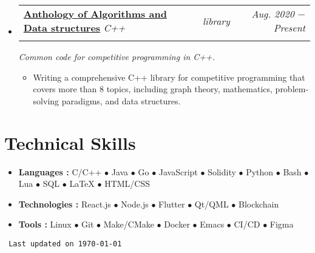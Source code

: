\documentclass[letterpaper, 11pt]{article}
\makeatletter
\newcommand{\project}[7] {
	\vspace{-1pt}\item[]
  \begin{tabular*}{1\textwidth}[t]{ll@{\extracolsep{\fill}}r}
    #1 \href{#4}{\textbf{\color{RoyalBlue}#2}}
    \textbar{} \textit{\small#5} \textbar{ } & \textit{\footnotesize#7} & \textit{\small #3} \\
    \vspace{-8pt}
  \end{tabular*}
  \textit{\small #6}
  \vspace{-8pt}
}
\newcommand{\subproject}[1] {
\item\small
  {#1}
  \vspace{-2pt}
}
\newcommand{\technicalskill}[3] {
  \vspace{-1pt}
\item\small
  #1 \textbf{#2 : }{\footnotesize{#3}}
  \vspace{-2pt}
}
\newcommand{\bulletitem}[1] {{\tiny$\bullet$} #1}
\makeatother
\begin{document}
\begin{itemize}[leftmargin=0pt]

  \project
  {\faIcon{laptop-code}}
  {Anthology of Algorithms and Data structures}{Aug. 2020 $-$ Present}
  {https://github.com/AbdeltwabMF/anthology-of-algorithms-and-data-structures}{C++}
  {Common code for competitive programming in C++.}{library}

  \begin{itemize}
    \subproject
    {Writing a comprehensive C++ library for competitive programming that covers more than 8 topics, including graph theory, mathematics, problem-solving paradigms, and data structures.}
  \end{itemize}\vspace{-4pt}
\end{itemize}

\section{Technical Skills}
\begin{itemize}[leftmargin=*]
  \technicalskill
  {}{Languages}
	{C/C++ \bulletitem{Java} \bulletitem{Go} \bulletitem{JavaScript} \bulletitem{Solidity} \bulletitem{Python} \bulletitem{Bash} \bulletitem{Lua} \bulletitem{SQL} \bulletitem{\LaTeX{}} \bulletitem{HTML/CSS}}

  \technicalskill
  {}{Technologies}
	{React.js \bulletitem{Node.js} \bulletitem{Flutter} \bulletitem{Qt/QML} \bulletitem{Blockchain}}

  \technicalskill
  {}{Tools}
  {Linux \bulletitem{Git} \bulletitem{Make/CMake} \bulletitem{Docker} \bulletitem{Emacs} \bulletitem{CI/CD} \bulletitem{Figma}}
\end{itemize}

\vspace{-25pt}
\begin{flushright}
	\texttt{\tiny 
		\color{Green}
		Last updated on \today
	}
\end{flushright}
\end{document}
